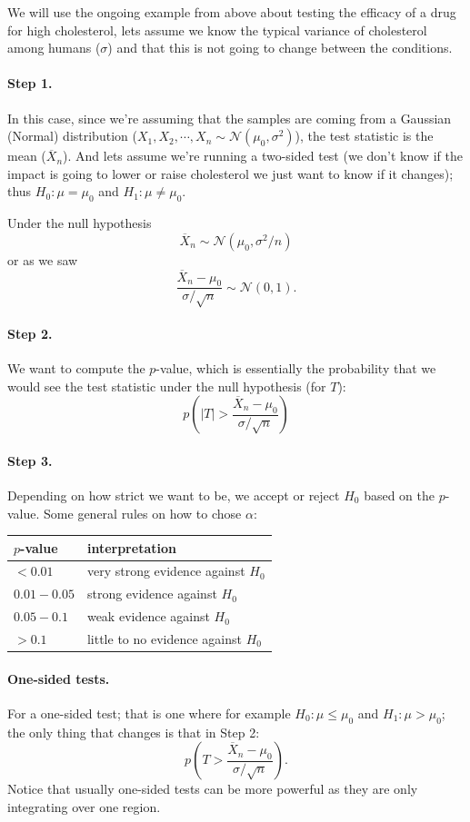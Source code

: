 We will use the ongoing example from above about testing the efficacy of a drug for high cholesterol, 
lets assume we know the typical variance of cholesterol among humans ($\sigma$) and that this is not going to change between the conditions. 

\paragraph{Step 1. }
In this case, since we're assuming that the samples are coming from a Gaussian (Normal) distribution ($X_1,X_2,\cdots,X_n\sim\mathcal{N}(\mu_0,\sigma^2)$), 
the test statistic is the mean ($\overline{X}_n$). 
And lets assume we're running a two-sided test 
(we don't know if the impact is going to lower or raise cholesterol we just want to know if it changes); thus
$H_0: \mu = \mu_0$ and $H_1: \mu \ne  \mu_0$.

Under the null hypothesis \[\overline{X}_n\sim\mathcal{N}(\mu_0, \sigma^2/n)\] 
or as we saw \[\frac{\overline{X}_n-\mu_0}{\sigma/\sqrt{n}}\sim\mathcal{N}(0,1).\]

\paragraph{Step 2.}
We want to compute the $p$-value, which is essentially the probability that we would see the test statistic under the null hypothesis (for $T$):
\[p\left(\left|T\right| > \frac{\overline{X}_n-\mu_0}{\sigma/\sqrt{n}}\right)\]

\paragraph{Step 3.}
Depending on how strict we want to be, we accept or reject $H_0$ based on the $p$-value. 
Some general rules on how to chose $\alpha$:
\begin{center}\begin{tabular}{|l||l|}
\hline
$p$-value & interpretation\\
\hline\hline
$< 0.01$ & very strong evidence against $H_0$\\
$0.01-0.05$&strong evidence against $H_0$\\
$0.05-0.1$&weak evidence against $H_0$\\
$> 0.1$&little to no evidence against $H_0$\\
\hline
\end{tabular}\end{center}

\paragraph{One-sided tests.} 
For a one-sided test; that is one where for example $H_0: \mu \le \mu_0$ and $H_1: \mu > \mu_0$; 
the only thing that changes is that in Step 2: 
\[p\left(T > \frac{\overline{X}_n-\mu_0}{\sigma/\sqrt{n}}\right).\]
Notice that usually one-sided tests can be more powerful as they are only integrating over one region. 

